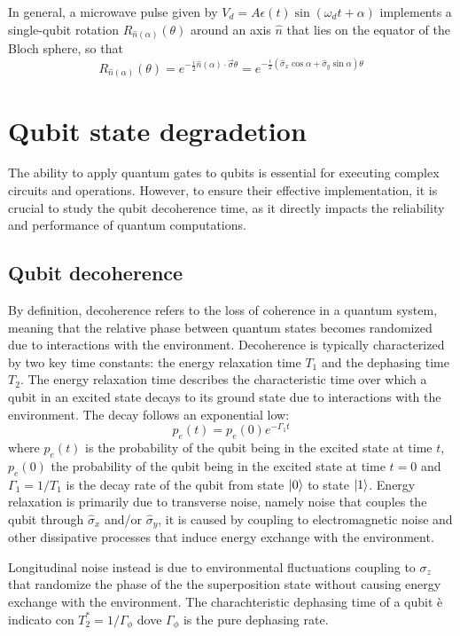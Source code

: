 In general, a microwave pulse given by $V_d = A\epsilon(t) \sin(\omega_d t + \alpha)$ implements a single-qubit rotation $R_{\hat{n}(\alpha)}(\theta)$ around an axis $\hat{n}$ that lies on the equator of the Bloch sphere, so that
\begin{equation}
    R_{\hat{n}(\alpha)}(\theta) = e^{-\frac{i}{2} \hat{n}(\alpha) \cdot \vec{\sigma} \theta} = e^{-\frac{i}{2} (\hat{\sigma}_x \cos \alpha + \hat{\sigma}_y \sin \alpha) \theta}
\end{equation}

\section{Qubit state degradetion}
The ability to apply quantum gates to qubits is essential for executing complex circuits and operations. 
However, to ensure their effective implementation, it is crucial to study the qubit decoherence time, as it directly impacts the reliability and performance of quantum computations.

\subsection{Qubit decoherence}
By definition, decoherence refers to the loss of coherence in a quantum system, meaning that the relative phase between quantum states becomes randomized due to interactions with the environment. 
Decoherence is typically characterized by two key time constants: the energy relaxation time $T_1$ and the dephasing time $T_2$. 
The energy relaxation time  describes the characteristic time over which a qubit in an excited state decays to its ground state due to interactions with the environment. The decay follows an exponential low:
\begin{equation}\label{eq:gamma1}
    p_e(t) = p_e(0) e^{-\Gamma_1 t}
\end{equation}
where $p_e(t)$ is the probability of the qubit being in the excited state at time $t$, $p_e(0)$ the probability of the qubit being in the excited state at time $t=0$ and $\Gamma_1=1/T_1$ is the decay rate of the qubit from state $\ket{0}$ to state $\ket{1}$.
Energy relaxation is primarily due to transverse noise, namely noise that couples the qubit through $\hat{\sigma}_x$ and/or $\hat{\sigma}_y$, it is caused by coupling to electromagnetic noise and other dissipative processes that induce energy exchange with the environment.

Longitudinal noise instead is due to environmental fluctuations coupling to $\sigma_z$ that randomize the phase of the the superposition state without causing energy exchange with the environment.
The charachteristic dephasing time of a qubit è indicato con $T_2^* = 1/\Gamma_\phi$ dove $\Gamma_\phi$ is the pure dephasing rate.


